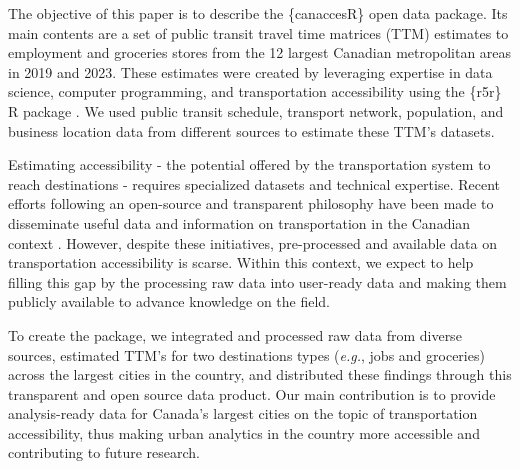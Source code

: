 \documentclass[Royal,times,sageh]{sagej}
\begin{document}
The objective of this paper is to describe the \{canaccesR\} open data
package. Its main contents are a set of public transit travel time
matrices (TTM) estimates to employment and groceries stores from the 12
largest Canadian metropolitan areas in 2019 and 2023. These estimates
were created by leveraging expertise in data science, computer
programming, and transportation accessibility using the \{r5r\} R
package \citep{pereiraR5rRapidRealistic2021}. We used public transit
schedule, transport network, population, and business location data from
different sources to estimate these TTM's datasets.

Estimating accessibility - the potential offered by the transportation
system to reach destinations
\citep{paezMeasuringAccessibilityPositive2012} - requires specialized
datasets and technical expertise. Recent efforts following an
open-source and transparent philosophy have been made to disseminate
useful data and information on transportation in the Canadian context
\citep{soukhovTTS2016RDataSet2023}. However, despite these initiatives,
pre-processed and available data on transportation accessibility is
scarse. Within this context, we expect to help filling this gap by the
processing raw data into user-ready data and making them publicly
available to advance knowledge on the field.

To create the package, we integrated and processed raw data from diverse
sources, estimated TTM's for two destinations types (\emph{e.g.}, jobs
and groceries) across the largest cities in the country, and distributed
these findings through this transparent and open source data product.
Our main contribution is to provide analysis-ready data for Canada's
largest cities on the topic of transportation accessibility, thus making
urban analytics in the country more accessible and contributing to
future research.
\end{document}
